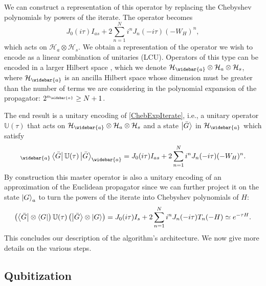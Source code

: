 \documentclass[a4paper,11pt]{article}
\begin{document}
\begin{itemize}
    We can construct a representation of this operator by replacing the Chebyshev polynomials by powers of the iterate. The operator becomes
    \begin{equation}
    J_0(i\tau)I_{as}+2\sum_{n=1}^{N} i^n J_n(-i\tau)(-W_H)^n,
    \label{ChebExpIterate}
    \end{equation}
    which acts on $\mathcal{H}_a\otimes\mathcal{H}_s$. We obtain a representation of the operator we wish to encode as a linear combination of unitaries (LCU). Operators of this type can be encoded in a larger Hilbert space \cite{Berry2015HamiltonianSW, doi:10.1137/16M1087072}, which we denote $\mathcal{H}_{\widebar{a}}\otimes\mathcal{H}_a\otimes\mathcal{H}_s$, where $\mathcal{H}_{\widebar{a}}$ is an ancilla Hilbert space whose dimension must be greater than the number of terms we are considering in the polynomial expansion of the propagator: $2^{n_{\widebar{a}}} \geq N + 1$.

    The end result is a unitary encoding of \eqref{ChebExpIterate}, i.e., a unitary operator $\mathbb{U}(\tau)$ that acts on $\mathcal{H}_{\widebar{a}}\otimes\mathcal{H}_a\otimes\mathcal{H}_s$ and a state $\ket{\bar{G}}$ in $\mathcal{H}_{\widebar{a}}$ which satisfy
    \begin{equation}
    _{\widebar{a}}\bra{\bar{G}}\mathbb{U}(\tau) \ket{\bar{G}}_{\widebar{a}} = J_0(i\tau)I_{as}+2\sum_{n=1}^{N} i^n J_n(-i\tau)(-W_H)^n.
    \end{equation}
    By construction this master operator is also a unitary encoding of an approximation of the Euclidean propagator since we can further project it on the state $\ket{G}_a$ to turn the powers of the iterate into Chebyshev polynomials of $H$: 
    \begin{equation}
    \left(\bra{\bar{G}}\otimes \bra{G}\right)\mathbb{U}(\tau)\left( \ket{\bar{G}}\otimes \ket{G}\right) = J_0(i\tau)I_s+2\sum_{n=1}^N i^n J_n(-i\tau)T_n(-H) \simeq e^{-\tau H}.
    \end{equation}
    This concludes our description of the algorithm's architecture. We now give more details on the various steps.
\end{itemize}
    
    
\subsection{Qubitization} 
\label{sec:qubitization}
\end{document}
